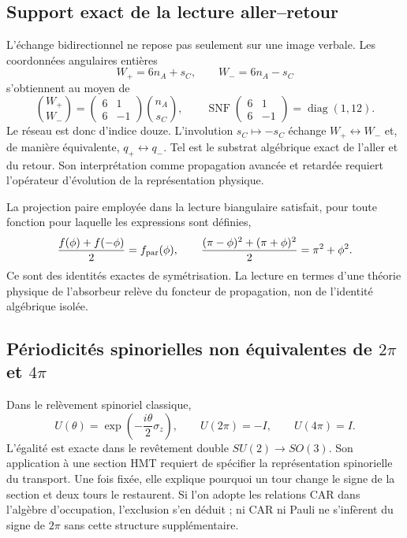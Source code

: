 \subsection{Support exact de la lecture aller--retour}

L'échange bidirectionnel ne repose pas seulement sur une image verbale. Les
coordonnées angulaires entières
\[
 W_+=6n_A+s_C,
 \qquad W_-=6n_A-s_C
\]
s'obtiennent au moyen de
\[
 \binom{W_+}{W_-}
 =\begin{pmatrix}6&1\\6&-1\end{pmatrix}
 \binom{n_A}{s_C},
 \qquad
 \operatorname{SNF}\!\begin{pmatrix}6&1\\6&-1\end{pmatrix}
 =\operatorname{diag}(1,12).
\]
Le réseau est donc d'indice douze. L'involution
\(s_C\mapsto-s_C\) échange \(W_+\leftrightarrow W_-\) et, de manière
équivalente, \(q_+\leftrightarrow q_-\). Tel est le substrat algébrique exact
de l'aller et du retour. Son interprétation comme propagation avancée et retardée
requiert l'opérateur d'évolution de la représentation physique.

La projection paire employée dans la lecture biangulaire satisfait, pour toute
fonction pour laquelle les expressions sont définies,
\[
 \frac{f(\phi)+f(-\phi)}2=f_{\rm par}(\phi),
 \qquad
 \frac{(\pi-\phi)^2+(\pi+\phi)^2}{2}=\pi^2+\phi^2.
\]
Ce sont des identités exactes de symétrisation. La lecture en termes d'une
théorie physique de l'absorbeur relève du foncteur de propagation, non de
l'identité algébrique isolée.

\subsection{Périodicités spinorielles non équivalentes de \texorpdfstring{\(2\pi\)}{2 pi} et \texorpdfstring{\(4\pi\)}{4 pi}}

Dans le relèvement spinoriel classique,
\[
 U(\theta)=\exp\!\left(-\frac{i\theta}{2}\sigma_z\right),
 \qquad U(2\pi)=-I,
 \qquad U(4\pi)=I.
\]
L'égalité est exacte dans le revêtement double \(SU(2)\to SO(3)\). Son application
à une section HMT requiert de spécifier la représentation spinorielle du
transport. Une fois fixée, elle explique pourquoi un tour change le signe de la
section et deux tours le restaurent. Si l'on adopte les relations CAR dans
l'algèbre d'occupation, l'exclusion s'en déduit ; ni CAR ni Pauli ne
s'infèrent du signe de \(2\pi\) sans cette structure supplémentaire.

